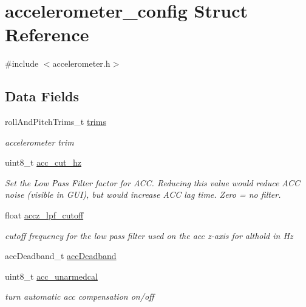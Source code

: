 \hypertarget{structaccelerometer__config}{\section{accelerometer\+\_\+config Struct Reference}
\label{structaccelerometer__config}
}


{\ttfamily \#include $<$accelerometer.\+h$>$}

\subsection*{Data Fields}
\begin{DoxyCompactItemize}
\item 
roll\+And\+Pitch\+Trims\+\_\+t \hyperlink{structaccelerometer__config_a28fc946f9334d6f6e18e166e81cc6d83}{trims}
\begin{DoxyCompactList}\small\item\em accelerometer trim \end{DoxyCompactList}\item 
uint8\+\_\+t \hyperlink{structaccelerometer__config_a088e69038ebd93df5ae3c56ea472fd16}{acc\+\_\+cut\+\_\+hz}
\begin{DoxyCompactList}\small\item\em Set the Low Pass Filter factor for A\+C\+C. Reducing this value would reduce A\+C\+C noise (visible in G\+U\+I), but would increase A\+C\+C lag time. Zero = no filter. \end{DoxyCompactList}\item 
float \hyperlink{structaccelerometer__config_a5d59b4a4c6c7fa689a43ba076ea587de}{accz\+\_\+lpf\+\_\+cutoff}
\begin{DoxyCompactList}\small\item\em cutoff frequency for the low pass filter used on the acc z-\/axis for althold in Hz \end{DoxyCompactList}\item 
acc\+Deadband\+\_\+t \hyperlink{structaccelerometer__config_a8a2c31e3f9d037e05d3c0b41a12ee7b2}{acc\+Deadband}
\item 
uint8\+\_\+t \hyperlink{structaccelerometer__config_a21468aef3b31e5be80c762fcfca24b95}{acc\+\_\+unarmedcal}
\begin{DoxyCompactList}\small\item\em turn automatic acc compensation on/off \end{DoxyCompactList}\end{DoxyCompactItemize}


